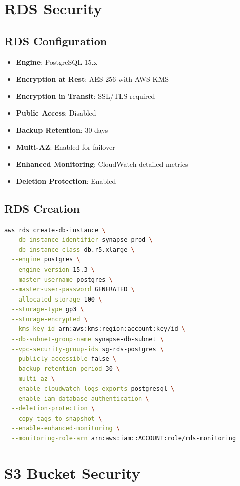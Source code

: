 \documentclass{report}
\begin{document}
\section{RDS Security}

\subsection{RDS Configuration}
\begin{itemize}
\item \textbf{Engine}: PostgreSQL 15.x
\item \textbf{Encryption at Rest}: AES-256 with AWS KMS
\item \textbf{Encryption in Transit}: SSL/TLS required
\item \textbf{Public Access}: Disabled
\item \textbf{Backup Retention}: 30 days
\item \textbf{Multi-AZ}: Enabled for failover
\item \textbf{Enhanced Monitoring}: CloudWatch detailed metrics
\item \textbf{Deletion Protection}: Enabled
\end{itemize}

\subsection{RDS Creation}
\begin{lstlisting}[language=bash]
aws rds create-db-instance \
  --db-instance-identifier synapse-prod \
  --db-instance-class db.r5.xlarge \
  --engine postgres \
  --engine-version 15.3 \
  --master-username postgres \
  --master-user-password GENERATED \
  --allocated-storage 100 \
  --storage-type gp3 \
  --storage-encrypted \
  --kms-key-id arn:aws:kms:region:account:key/id \
  --db-subnet-group-name synapse-db-subnet \
  --vpc-security-group-ids sg-rds-postgres \
  --publicly-accessible false \
  --backup-retention-period 30 \
  --multi-az \
  --enable-cloudwatch-logs-exports postgresql \
  --enable-iam-database-authentication \
  --deletion-protection \
  --copy-tags-to-snapshot \
  --enable-enhanced-monitoring \
  --monitoring-role-arn arn:aws:iam::ACCOUNT:role/rds-monitoring
\end{lstlisting}

\section{S3 Bucket Security}
\end{document}
